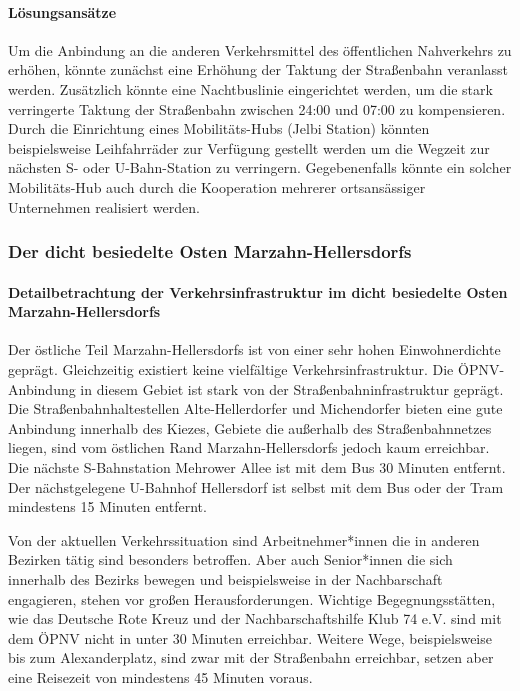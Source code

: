 \paragraph{Lösungsansätze}
Um die Anbindung an die anderen Verkehrsmittel des öffentlichen Nahverkehrs zu erhöhen, könnte zunächst eine Erhöhung der Taktung der Straßenbahn veranlasst werden. Zusätzlich könnte eine Nachtbuslinie eingerichtet werden, um die stark verringerte Taktung der Straßenbahn zwischen 24:00 und 07:00 zu kompensieren. Durch die Einrichtung eines Mobilitäts-Hubs (Jelbi Station) könnten beispielsweise Leihfahrräder zur Verfügung gestellt werden um die Wegzeit zur nächsten S- oder U-Bahn-Station zu verringern. Gegebenenfalls könnte ein solcher Mobilitäts-Hub auch durch die Kooperation mehrerer ortsansässiger Unternehmen realisiert werden.

\subsubsection{Der dicht besiedelte Osten Marzahn-Hellersdorfs}
\paragraph{Detailbetrachtung der Verkehrsinfrastruktur im dicht besiedelte Osten Marzahn-Hellersdorfs}
Der östliche Teil Marzahn-Hellersdorfs ist von einer sehr hohen Einwohnerdichte geprägt. Gleichzeitig existiert keine vielfältige Verkehrsinfrastruktur. Die ÖPNV-Anbindung in diesem Gebiet ist stark von der Straßenbahninfrastruktur geprägt. Die Straßenbahnhaltestellen Alte-Hellerdorfer und Michendorfer bieten eine gute Anbindung innerhalb des Kiezes, Gebiete die außerhalb des Straßenbahnnetzes liegen, sind vom östlichen Rand Marzahn-Hellersdorfs jedoch kaum erreichbar. Die nächste S-Bahnstation Mehrower Allee ist mit dem Bus 30 Minuten entfernt. Der nächstgelegene U-Bahnhof Hellersdorf ist selbst mit dem Bus oder der Tram mindestens 15 Minuten entfernt.


Von der aktuellen Verkehrssituation sind Arbeitnehmer*innen die in anderen Bezirken tätig sind besonders betroffen. Aber auch Senior*innen die sich innerhalb des Bezirks bewegen und beispielsweise in der Nachbarschaft engagieren, stehen vor großen Herausforderungen. Wichtige Begegnungsstätten, wie das Deutsche Rote Kreuz und der Nachbarschaftshilfe Klub 74 e.V. sind mit dem ÖPNV nicht in unter 30 Minuten erreichbar. Weitere Wege, beispielsweise bis zum Alexanderplatz, sind zwar mit der Straßenbahn erreichbar, setzen aber eine Reisezeit von mindestens 45 Minuten voraus.

